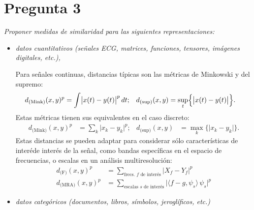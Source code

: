 \documentclass[spanish]{article}
\newcommand{\pregunta}{\textit}
\newcommand{\abs}[1]{\lvert#1\rvert}
\begin{document}
\section*{Pregunta 3}
\pregunta{Proponer medidas de similaridad para las siguientes representaciones:}
    \begin{itemize}
        \item \pregunta{datos cuantitativos
            (señales ECG, matrices, funciones, tensores, imágenes digitales, etc.),}

            Para señales continuas, distancias típicas son las métricas de Minkowski y
            del supremo:
            \begin{align}
                d_{\text{(Mink)}}(x, y)^p &= \int\bigl\lvert x(t) - y(t)\bigr\rvert^{p}\,dt; &
                d_{\text{(sup)}}(x, y) &= \sup_t \Bigl\{\bigl\lvert x(t) - y(t)\bigr\rvert\Bigr\}.
            \end{align}
            Estas métricas tienen sus equivalentes en el caso discreto:
            \begin{align}
                d_{\text{(Mink)}}(x, y)^p &= \sum_k \abs{x_k - y_k}^p; &
                d_{\text{(sup)}}(x, y) &= \max_k\bigl\{\abs{x_k - y_k}\bigr\}.
            \end{align}
            Estas distancias se pueden adaptar para considerar sólo características de interéde
            interés de la
            señal, como bandas específicas en el espacio de frecuencias, o escalas en un análisis
            multiresolución:
            \begin{align}
                d_{\text{(F)}}(x, y)^p   &= 
                    \sum_{\text{frecs. $f$ de interés}} \abs{X_f - Y_f}^p \\
                d_{\text{(MRA)}}(x, y)^p &= 
                    \sum_{\text{escalas $s$ de interés}}
                    \bigl\lvert\langle f - g, \psi_s \rangle\,\psi_s \bigr\rvert^p
            \end{align}

        \item \pregunta{datos categóricos
            (documentos, libros, símbolos, jeroglíficos, etc.)}


\end{itemize}
\end{document}
